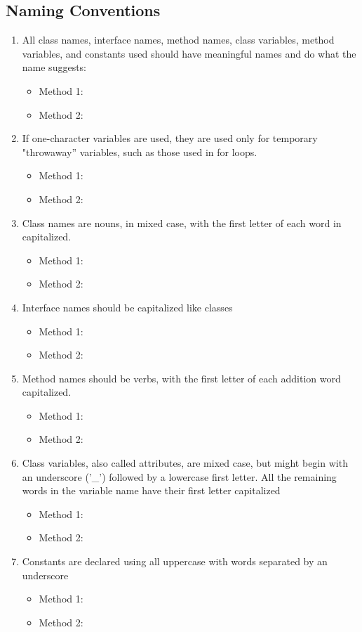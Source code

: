 \subsection{Naming Conventions}
\begin{enumerate}
\setcounter{enumi}{0}
	\item All class names, interface names, method names, class variables, method variables, and constants used should have meaningful names and do what the name suggests:
	\begin{itemize}
	 	\item Method 1: \cmark
		 \item Method 2: 
	\end{itemize}
	\item If one-character variables are used, they are used only for temporary "throwaway” variables, such as those used in for loops.
	\begin{itemize}
	 	\item Method 1: \cmark
	 \item Method 2: 
	\end{itemize}
	\item Class names are nouns, in mixed case, with the first letter of each word in capitalized.
	\begin{itemize}
	 	\item Method 1: \cmark
 		\item Method 2: 
	\end{itemize}
	\item Interface names should be capitalized like classes
	\begin{itemize}
	 	\item Method 1: \cmark
 		\item Method 2: 
	\end{itemize}	
	\item Method names should be verbs, with the first letter of each addition word capitalized.
	\begin{itemize}
	 	\item Method 1: \cmark
 		\item Method 2: 
	\end{itemize}
	\item Class variables, also called attributes, are mixed case, but might begin with an underscore
	('\_') followed by a lowercase first letter. All the remaining words in the variable name have
	their first letter capitalized
	\begin{itemize}
	 	\item Method 1: \cmark
 		\item Method 2: 
	\end{itemize}
	\item Constants are declared using all uppercase with words separated by an underscore
	\begin{itemize}
	 	\item Method 1: \cmark
 		\item Method 2: 
	\end{itemize}	
\end{enumerate}